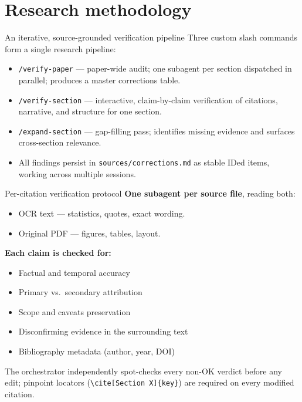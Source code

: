 \documentclass{beamer}
\begin{document}
\section{Research methodology}

\begin{frame}{An iterative, source-grounded verification pipeline}
    Three custom slash commands form a single research pipeline:
    \begin{itemize}
        \item \texttt{/verify-paper} --- paper-wide audit; one subagent per section dispatched in parallel; produces a master corrections table. \vspace{4mm}
        \item \texttt{/verify-section} --- interactive, claim-by-claim verification of citations, narrative, and structure for one section. \vspace{4mm}
        \item \texttt{/expand-section} --- gap-filling pass; identifies missing evidence and surfaces cross-section relevance. \vspace{4mm}
        \item All findings persist in \texttt{sources/corrections.md} as stable IDed items, working across multiple sessions.
    \end{itemize}
\end{frame}

\begin{frame}{Per-citation verification protocol}
    \textbf{One subagent per source file}, reading both:
    \begin{itemize}
        \item OCR text --- statistics, quotes, exact wording.
        \item Original PDF --- figures, tables, layout.
    \end{itemize}
    \vspace{2mm}
    \textbf{Each claim is checked for:}
    \begin{itemize}
        \item Factual and temporal accuracy
        \item Primary vs.\ secondary attribution
        \item Scope and caveats preservation
        \item Disconfirming evidence in the surrounding text
        \item Bibliography metadata (author, year, DOI)
    \end{itemize}
    \vspace{2mm}
    The orchestrator independently spot-checks every non-OK verdict before any edit; pinpoint locators (\texttt{\textbackslash cite[Section~X]\{key\}}) are required on every modified citation.
\end{frame}
\end{document}
